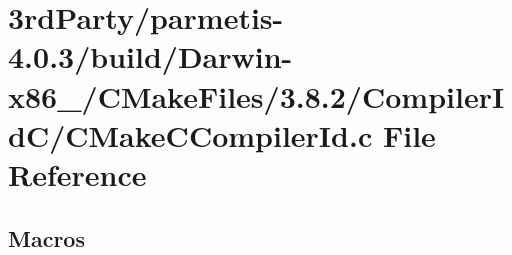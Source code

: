 \hypertarget{3rd_party_2parmetis-4_80_83_2build_2_darwin-x86__64_2_c_make_files_23_88_82_2_compiler_id_c_2_c_make_c_compiler_id_8c}{}\section{3rd\+Party/parmetis-\/4.0.3/build/\+Darwin-\/x86\+\_/\+C\+Make\+Files/3.8.2/\+Compiler\+Id\+C/\+C\+Make\+C\+Compiler\+Id.c File Reference}
\label{3rd_party_2parmetis-4_80_83_2build_2_darwin-x86__64_2_c_make_files_23_88_82_2_compiler_id_c_2_c_make_c_compiler_id_8c}
\subsection*{Macros}
